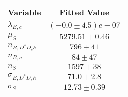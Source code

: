 \begin{tabular}[t]{lc}
\hline
Variable &Fitted Value\\
\hline\hline
$\lambda_{B,c}$&$(-0.0\pm4.5)e-07$\\
\hline
$\mu_S$&$5279.51\pm0.46$\\
\hline
$n_{B, D^* D_s h}$&$796\pm41$\\
\hline
$n_{B,c}$&$84\pm47$\\
\hline
$n_S$&$1597\pm38$\\
\hline
$\sigma_{B, D^* D_s h}$&$71.0\pm2.8$\\
\hline
$\sigma_S$&$12.73\pm0.39$\\
\hline
\end{tabular}